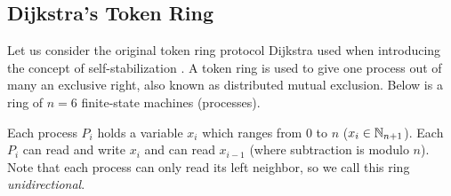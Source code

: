 \subsection{Dijkstra's Token Ring \cite{dij}}


Let us consider the original token ring protocol Dijkstra used when introducing the concept of self-stabilization \cite{dij}.
A token ring is used to give one process out of many an exclusive right, also known as distributed mutual exclusion.
Below is a ring of $n=6$ finite-state machines (processes).

Each process $P_i$ holds a variable $x_i$ which ranges from $0$ to $n$ ($x_i\in\mathbb{N}_{n+1}$).
Each $P_i$ can read and write $x_i$ and can read $x_{i-1}$ (where subtraction is modulo $n$).
Note that each process can only read its left neighbor, so we call this ring {\em unidirectional}.


